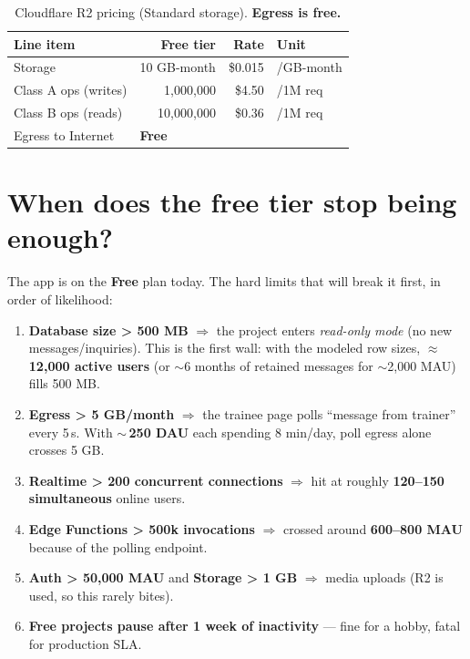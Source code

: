 \documentclass[11pt]{article}
\begin{document}
\begin{table}[H]\centering\small
\caption{Cloudflare R2 pricing (Standard storage). \textbf{Egress is free.}}
\begin{tabular}{l r r l}
\toprule
\textbf{Line item} & \textbf{Free tier} & \textbf{Rate} & \textbf{Unit} \\
\midrule
Storage                & 10 GB-month    & \$0.015  & /GB-month \\
Class A ops (writes)   & 1{,}000{,}000  & \$4.50   & /1M req \\
Class B ops (reads)    & 10{,}000{,}000 & \$0.36   & /1M req \\
Egress to Internet     & \multicolumn{2}{l}{\textbf{Free}} & \\
\bottomrule
\end{tabular}
\end{table}

\section{When does the free tier stop being enough?}

The app is on the \textbf{Free} plan today. The hard limits that will break it first, in order of likelihood:

\begin{enumerate}[leftmargin=*]
\item \textbf{Database size \textgreater{} 500 MB} $\Rightarrow$ the project enters \emph{read-only mode} (no new messages/inquiries). This is the first wall: with the modeled row sizes, $\approx$\,\textbf{12{,}000 active users} (or $\sim$6 months of retained messages for $\sim$2{,}000 MAU) fills 500 MB.
\item \textbf{Egress \textgreater{} 5 GB/month} $\Rightarrow$ the trainee page polls ``message from trainer'' every 5\,s. With $\sim$\,\textbf{250 DAU} each spending 8 min/day, poll egress alone crosses 5 GB.
\item \textbf{Realtime \textgreater{} 200 concurrent connections} $\Rightarrow$ hit at roughly \textbf{120--150 simultaneous} online users.
\item \textbf{Edge Functions \textgreater{} 500k invocations} $\Rightarrow$ crossed around \textbf{600--800 MAU} because of the polling endpoint.
\item \textbf{Auth \textgreater{} 50{,}000 MAU} and \textbf{Storage \textgreater{} 1 GB} $\Rightarrow$ media uploads (R2 is used, so this rarely bites).
\item \textbf{Free projects pause after 1 week of inactivity} — fine for a hobby, fatal for production SLA.
\end{enumerate}
\end{document}
